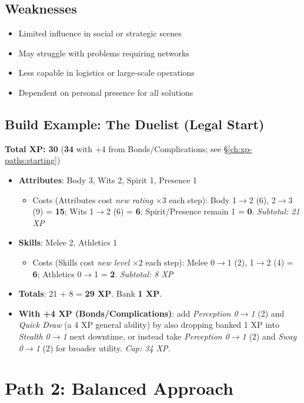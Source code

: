 \subsection*{Weaknesses}
\begin{itemize}
\item Limited influence in social or strategic scenes
\item May struggle with problems requiring networks
\item Less capable in logistics or large-scale operations
\item Dependent on personal presence for all solutions
\end{itemize}

\subsection*{Build Example: The Duelist (Legal Start)}
\textbf{Total XP: 30} \quad (\textbf{34} with +4 from Bonds/Complications; see \S\ref{ch:xp-paths:starting})
\begin{itemize}
\item \textbf{Attributes}: Body 3, Wits 2, Spirit 1, Presence 1
  \begin{itemize}
  \item Costs (Attributes cost \emph{new rating} $\times 3$ each step): Body 1$\to$2 (6), 2$\to$3 (9) = \textbf{15}; Wits 1$\to$2 (6) = \textbf{6}; Spirit/Presence remain 1 = \textbf{0}. \emph{Subtotal: 21 XP}
  \end{itemize}
\item \textbf{Skills}: Melee 2, Athletics 1
  \begin{itemize}
  \item Costs (Skills cost \emph{new level} $\times 2$ each step): Melee 0$\to$1 (2), 1$\to$2 (4) = \textbf{6}; Athletics 0$\to$1 = \textbf{2}. \emph{Subtotal: 8 XP}
  \end{itemize}
\item \textbf{Totals}: 21 + 8 = \textbf{29 XP}. Bank \textbf{1 XP}.
\item \textbf{With +4 XP (Bonds/Complications)}: add \emph{Perception 0$\to$1} (2) and \emph{Quick Draw} (a 4 XP general ability) by also dropping banked 1 XP into \emph{Stealth 0$\to$1} next downtime, or instead take \emph{Perception 0$\to$1} (2) and \emph{Sway 0$\to$1} (2) for broader utility. \emph{Cap: 34 XP}.
\end{itemize}

\section{Path 2: Balanced Approach}

